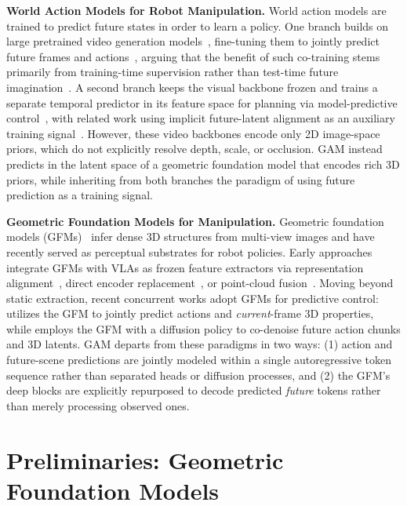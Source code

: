 \documentclass{llmxive}
\begin{document}
\noindent\textbf{World Action Models for Robot Manipulation.}
World action models are trained to predict future states in order to learn a policy. One branch builds on large pretrained video generation models~\citep{agarwal2025cosmos}, fine-tuning them to jointly predict future frames and actions~\citep{kim2026cosmos, pai2025mimic, ye2026world}, arguing that the benefit of such co-training stems primarily from training-time supervision rather than test-time future imagination~\citep{ye2026world, pi0_fast}. A second branch keeps the visual backbone frozen and trains a separate temporal predictor in its feature space for planning via model-predictive control~\citep{zhou2024dino, assran2025v}, with related work using implicit future-latent alignment as an auxiliary training signal~\citep{zheng2025flare}. However, these video backbones encode only 2D image-space priors, which do not explicitly resolve depth, scale, or occlusion. GAM instead predicts in the latent space of a geometric foundation model that encodes rich 3D priors, while inheriting from both branches the paradigm of using future prediction as a training signal.


\noindent\textbf{Geometric Foundation Models for Manipulation.} Geometric foundation models (GFMs)~\cite{wang2025vggt, lin2025depth, wang2025pi, keetha2025mapanything} infer dense 3D structures from multi-view images and have recently served as perceptual substrates for robot policies. Early approaches integrate GFMs with VLAs as frozen feature extractors via representation alignment~\citep{li2025spatial, sun2026rocket}, direct encoder replacement~\citep{abouzeid2025geoaware, qian2025gp3}, or point-cloud fusion~\citep{sun2025geovla}. Moving beyond static extraction, recent concurrent works adopt GFMs for predictive control: \citet{song2026robotic} utilizes the GFM to jointly predict actions and \emph{current}-frame 3D properties, while \citet{xu2026action} employs the GFM with a diffusion policy to co-denoise future action chunks and 3D latents. GAM departs from these paradigms in two ways: (1) action and future-scene predictions are jointly modeled within a single autoregressive token sequence rather than separated heads or diffusion processes, and (2) the GFM's deep blocks are explicitly repurposed to decode predicted \emph{future} tokens rather than merely processing observed ones.




\section{Preliminaries: Geometric Foundation Models}
\label{sec:prelim}
\end{document}
